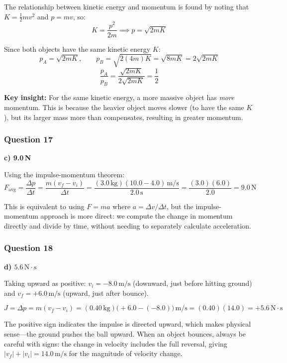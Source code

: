 \documentclass[12pt,letterpaper]{article}
\begin{document}
\begin{explanationbox}
The relationship between kinetic energy and momentum is found by noting that $K = \frac{1}{2}mv^2$ and $p = mv$, so:
\[
K = \frac{p^2}{2m} \implies p = \sqrt{2mK}
\]

Since both objects have the same kinetic energy $K$:
\[
p_A = \sqrt{2mK}, \qquad p_B = \sqrt{2(4m)K} = \sqrt{8mK} = 2\sqrt{2mK}
\]
\[
\frac{p_A}{p_B} = \frac{\sqrt{2mK}}{2\sqrt{2mK}} = \frac{1}{2}
\]

\textbf{Key insight:} For the same kinetic energy, a more massive object has \emph{more} momentum. This is because the heavier object moves slower (to have the same $K$), but its larger mass more than compensates, resulting in greater momentum.
\end{explanationbox}

\subsubsection*{Question 17}

\begin{answerbox}
\textbf{c) 9.0\,N}
\end{answerbox}

\begin{explanationbox}
Using the impulse-momentum theorem:
\[
F_{\text{avg}} = \frac{\Delta p}{\Delta t} = \frac{m(v_f - v_i)}{\Delta t} = \frac{(3.0\,\text{kg})(10.0 - 4.0)\,\text{m/s}}{2.0\,\text{s}} = \frac{(3.0)(6.0)}{2.0} = 9.0\,\text{N}
\]

This is equivalent to using $F = ma$ where $a = \Delta v / \Delta t$, but the impulse-momentum approach is more direct: we
compute the change in momentum directly and divide by time, without needing to separately calculate acceleration.
\end{explanationbox}

\subsubsection*{Question 18}

\begin{answerbox}
\textbf{d) $5.6\,\text{N}\cdot\text{s}$}
\end{answerbox}

\begin{explanationbox}
Taking upward as positive: $v_i = -8.0\,\text{m/s}$ (downward, just before hitting ground) and $v_f = +6.0\,\text{m/s}$ (upward, just after bounce).

\[
J = \Delta p = m(v_f - v_i) = (0.40\,\text{kg})\bigl(+6.0 - (-8.0)\bigr)\,\text{m/s} = (0.40)(14.0) = +5.6\,\text{N}\cdot\text{s}
\]

The positive sign indicates the impulse is directed upward, which makes physical sense---the ground pushes the ball upward. When an object bounces, always be careful with signs: the change in velocity includes the full reversal, giving $|v_f| + |v_i| = 14.0\,\text{m/s}$ for the magnitude of velocity change.
\end{explanationbox}
\end{document}
